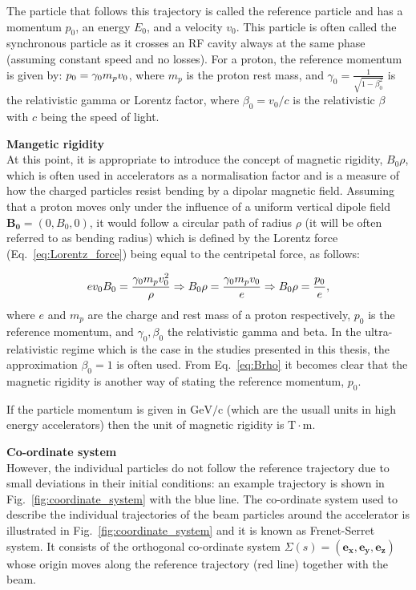 The particle that follows this trajectory is called the reference particle and has a momentum $p_0$, an energy $E_0$, and a velocity $v_0$. This particle is often called the synchronous particle as it crosses an RF cavity always at the same phase (assuming constant speed and no losses). %
For a proton, the reference momentum is given by: $p_0 = {\gamma_0} m_p v_0$, where $m_p$ is the proton rest mass, and $\gamma_0 = \frac{1}{\sqrt{1-\beta_0^2}}$ is the relativistic gamma or Lorentz factor, where $\beta_0=v_0/c$ is the relativistic $\beta$ with $c$ being the speed of light. 

\textbf{Mangetic rigidity}\\
At this point, it is appropriate to introduce the concept of magnetic rigidity, $B_0 \rho$, which is often used in accelerators as a normalisation factor and is a measure of how the charged particles resist bending by a dipolar magnetic field. Assuming that a proton moves only under the influence of a uniform vertical dipole field $\mathbf{B_0}=(0, B_0, 0)$, it would follow a circular path of radius $\rho$ (it will be often referred to as bending radius) which is defined by the Lorentz force (Eq.~\eqref{eq:Lorentz_force}) being equal to the centripetal force, as follows:

\begin{equation}\label{eq:Brho}
    e v_0 B_0 = \frac{{\gamma_0} m_p v_0^2}{\rho} \Rightarrow B_0 \rho = \frac{\gamma_0 m_p v_0}{e} \Rightarrow B_0 \rho = \frac{p_0}{e},
\end{equation}
where $e$ and $m_p$ are the charge and rest mass of a proton respectively, $p_0$ is the reference momentum, and $\gamma_0, \beta_0$ the relativistic gamma and beta. In the ultra-relativistic regime which is the case in the studies presented in this thesis, the approximation $\beta_0=1$ is often used. From Eq.~\eqref{eq:Brho} it becomes clear that the magnetic rigidity is another way of stating the reference momentum, $p_0$.

If the particle momentum is given in $\mathrm{GeV /c}$ (which are the usuall units in high energy accelerators) then the unit of magnetic rigidity is $\mathrm{T \cdot m}$. 


\textbf{Co-ordinate system}\\
However, the individual particles do not follow the reference trajectory due to small deviations in their initial conditions: an example trajectory is shown in Fig.~\ref{fig:coordinate_system} with the blue line. The co-ordinate system used to describe the individual trajectories of the beam particles around the accelerator is illustrated in Fig.~\ref{fig:coordinate_system} and it is known as Frenet-Serret system.  It consists of the orthogonal co-ordinate system $\Sigma(s) = (\mathbf{e_x}, \mathbf{e_y}, \mathbf{e_z})$ whose origin moves along the reference trajectory (red line) together with the beam. 

